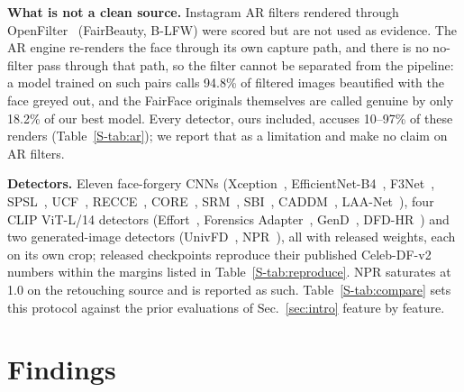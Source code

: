 \documentclass[conference]{IEEEtran}
\begin{document}
\textbf{What is not a clean source.} Instagram AR filters rendered through OpenFilter~\cite{openfilter2022} (FairBeauty,
B-LFW) were scored but are not used as evidence. The AR engine re-renders the face through its own capture path, and there
is no no-filter pass through that path, so the filter cannot be separated from the pipeline: a model trained on such pairs
calls 94.8\% of filtered images beautified with the face greyed out,
and the FairFace originals themselves are called genuine by only 18.2\% of our best model.
Every detector, ours included, accuses 10--97\% of these renders (Table~\ref{S-tab:ar}); we report that as a limitation and
make no claim on AR filters.

\textbf{Detectors.} Eleven face-forgery CNNs (Xception~\cite{xception}, EfficientNet-B4~\cite{efficientnet},
F3Net~\cite{f3net}, SPSL~\cite{spsl}, UCF~\cite{ucf}, RECCE~\cite{recce}, CORE~\cite{core}, SRM~\cite{srm}, SBI~\cite{sbi},
CADDM~\cite{caddm}, LAA-Net~\cite{laanet}), four CLIP ViT-L/14 detectors (Effort~\cite{effort}, Forensics
Adapter~\cite{forensicsadapter}, GenD~\cite{gend2026}, DFD-HR~\cite{dfdhr2026}) and two generated-image detectors
(UnivFD~\cite{univfd}, NPR~\cite{npr}), all with released weights, each on its own crop; released checkpoints reproduce
their published Celeb-DF-v2 numbers within the margins listed in Table~\ref{S-tab:reproduce}. NPR saturates at 1.0 on the
retouching source and is reported as such. Table~\ref{S-tab:compare} sets this protocol against the prior evaluations of
Sec.~\ref{sec:intro} feature by feature.


\section{Findings}
\label{sec:findings}
\end{document}
